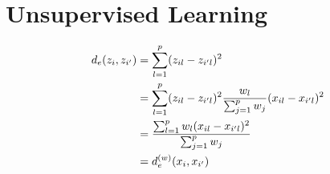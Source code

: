 \chapter{Unsupervised Learning}
\label{ch:14}

\begin{exercise}
  \begin{align}
    d_e(z_i, z_{i'}) &= \sum_{l=1}^p(z_{il} - z_{i'l})^2 \notag \\
    &= \sum_{l=1}^p(z_{il} - z_{i'l})^2 \frac{w_l}{\sum_{j=1}^pw_j}(x_{il} -
    x_{i'l})^2 \notag\\
    &= \frac{ \sum_{l=1}^pw_l(x_{il} -
    x_{i'l})^2}{\sum_{j=1}^pw_j} \notag\\
    &= d_e^{(w)}(x_i, x_{i'})
  \end{align}
\end{exercise}

